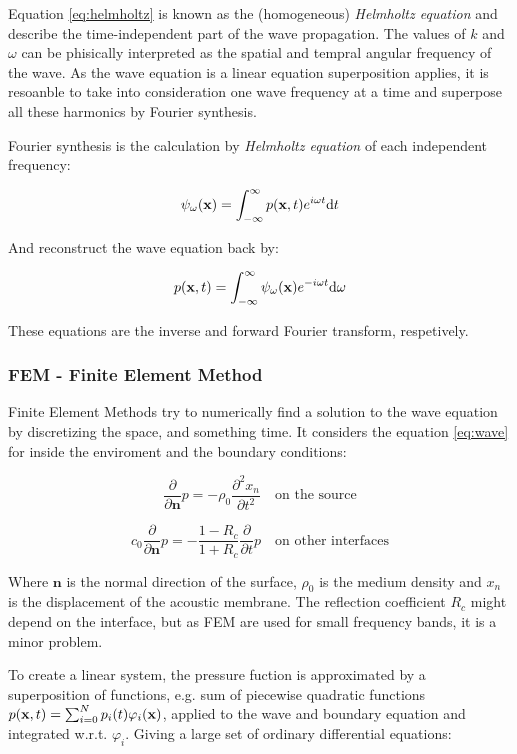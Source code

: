 Equation \ref{eq:helmholtz} is known as the (homogeneous) \textit{Helmholtz
equation} and describe the time-independent part of the wave propagation. The
values of $k$ and $\omega$ can be phisically interpreted as the spatial and
tempral angular frequency of the wave. As the wave equation is a linear
equation superposition applies, it is resoanble to take into consideration
one wave frequency at a time and superpose all these harmonics by Fourier
synthesis\cite{Lefebvre}.

Fourier synthesis is the calculation by \textit{Helmholtz
equation} of each independent frequency: 

\[ \psi_\omega(\mathrm{\mathbf{x}}) = \int_{-\infty}^\infty p(\mathrm{\mathbf{x}},t)e^{i\omega t}\mathrm{d} t \]

And reconstruct the wave equation back by:

\[ p(\mathrm{\mathbf{x}},t) = \int_{-\infty}^\infty\psi_\omega(\mathrm{\mathbf{x}})e^{-i\omega t}\mathrm{d}\omega \]

These equations are the inverse and forward Fourier transform, respetively.

\subsubsection{FEM - Finite Element Method}

Finite Element Methods try to numerically find a solution to the wave equation
by discretizing the space, and something time. It considers the equation
\ref{eq:wave} for inside the enviroment and the boundary conditions:

\[  \frac{\partial}{\partial \mathbf{n}}p= -\rho_0 \frac{\partial^2
x_n}{\partial t^2} \quad \text{on the source} \]

\[  c_0 \frac{\partial}{\partial \mathbf{n}}p= - \frac{1-R_c}{1+R_c}
\frac{\partial}{\partial t} p \quad \text{on other interfaces} \]

Where $\mathbf{n}$ is the normal direction of the surface, $\rho_0$ is the
medium density and $x_n$ is the displacement of the acoustic membrane. The
reflection coefficient $R_c$ might depend on the interface, but as FEM are used
for small frequency bands, it is a minor problem\cite{deines2006comparative}.

To create a linear system, the pressure fuction is approximated by a
superposition of functions, e.g. sum of piecewise quadratic functions \(
p(\mathrm{\mathbf{x}},t)= \sum_{i=0}^N p_i(t) \varphi_i(\mathrm{\mathbf{x}}) \), applied to the wave and boundary
equation and integrated w.r.t. $\varphi_i$. Giving a large set of ordinary
differential equations:

